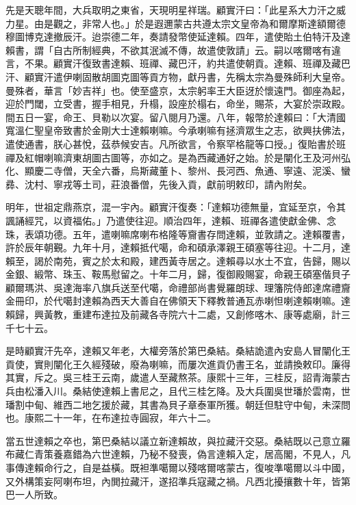 \begin{pinyinscope}
先是天聰年間，大兵取明之東省，天現明星祥瑞。顧實汗曰：「此星系大力汗之威力星。由是觀之，非常人也。」於是遐邇蒙古共遵太宗文皇帝為和爾摩斯達額爾德穆圖博克達撤辰汗。迨崇德二年，奏請發幣使延達賴。四年，遣使貽土伯特汗及達賴書，謂「自古所制經典，不欲其泯滅不傳，故遣使敦請」云。嗣以喀爾喀有違言，不果。顧實汗復致書達賴、班禪、藏巴汗，約共遣使朝貢。達賴、班禪及藏巴汗、顧實汗遣伊喇固散胡圖克圖等貢方物，獻丹書，先稱太宗為曼殊師利大皇帝。曼殊者，華言「妙吉祥」也。使至盛京，太宗躬率王大臣迓於懷遠門。御座為起，迎於門閾，立受書，握手相見，升榻，設座於榻右，命坐，賜茶，大宴於崇政殿。間五日一宴，命王、貝勒以次宴。留八閱月乃還。八年，報幣於達賴曰：「大清國寬溫仁聖皇帝致書於金剛大士達賴喇嘛。今承喇嘛有拯濟眾生之志，欲興扶佛法，遣使通書，朕心甚悅，茲恭候安吉。凡所欲言，令察罕格龍等口授。」復貽書於班禪及紅帽喇嘛濟東胡圖古圖等，亦如之。是為西藏通好之始。於是闡化王及河州弘化、顯慶二寺僧，天全六番，烏斯藏董卜、黎州、長河西、魚通、寧遠、泥溪、蠻彞、沈村、寧戎等土司，莊浪番僧，先後入貢，獻前明敕印，請內附矣。

明年，世祖定鼎燕京，混一宇內。顧實汗復奏：「達賴功德無量，宜延至京，令其諷誦經咒，以資福佑。」乃遣使往迎。順治四年，達賴、班禪各遣使獻金佛、念珠，表頌功德。五年，遣喇嘛席喇布格隆等齎書存問達賴，並敦請之。達賴覆書，許於辰年朝覲。九年十月，達賴抵代噶，命和碩承澤親王碩塞等往迎。十二月，達賴至，謁於南苑，賓之於太和殿，建西黃寺居之。達賴尋以水土不宜，告歸，賜以金銀、緞幣、珠玉、鞍馬慰留之。十年二月，歸，復御殿賜宴，命親王碩塞偕貝子顧爾瑪洪、吳達海率八旗兵送至代噶，命禮部尚書覺羅朗球、理籓院侍郎達席禮齎金冊印，於代噶封達賴為西天大善自在佛領天下釋教普通瓦赤喇怛喇達賴喇嘛。達賴歸，興黃教，重建布達拉及前藏各寺院六十二處，又創修喀木、康等處廟，計三千七十云。

是時顧實汗先卒，達賴又年老，大權旁落於第巴桑結。桑結詭遣內安島人冒闡化王貢使，實則闡化王久經殘破，廢為喇嘛，而屢次進貢仍書王名，並請換敕印。廉得其實，斥之。吳三桂王云南，歲遣人至藏熬茶。康熙十三年，三桂反，詔青海蒙古兵由松潘入川。桑結使達賴上書尼之，且代三桂乞降。及大兵圍吳世璠於雲南，世璠割中甸、維西二地乞援於藏，其書為貝子章泰軍所獲。朝廷但駐守中甸，未深問也。康熙二十一年，在布達拉寺圓寂，年六十二。

當五世達賴之卒也，第巴桑結以議立新達賴故，與拉藏汗交惡。桑結既以己意立羅布藏仁青策養嘉錯為六世達賴，乃秘不發喪，偽言達賴入定，居高閣，不見人，凡事傳達賴命行之，自是益橫。既袒準噶爾以殘喀爾喀蒙古，復唆準噶爾以斗中國，又外構策妄阿喇布坦，內閧拉藏汗，遂招準兵寇藏之禍。凡西北擾攘數十年，皆第巴一人所致。


\end{pinyinscope}
